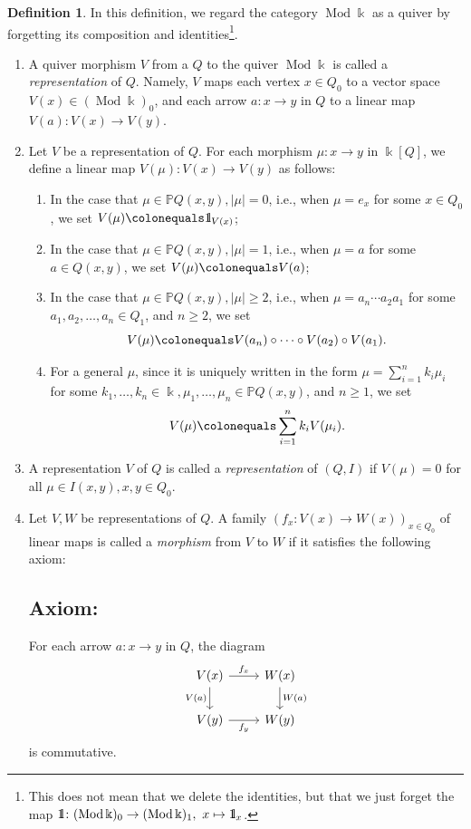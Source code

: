 \documentclass{surv-l}
\numberwithin{equation}{chapter}
\numberwithin{figure}{chapter}
\theoremstyle{plain}
\theoremstyle{definition}
\newtheorem{dfn}[thm]{Definition}
\theoremstyle{remark}
\newcommand{\id}{1\kern-.25em{\text{{\rm l}}}}
\newcommand{\Ar}[3]{\ar[from={#1}, to={#2}, #3]}
\DeclareMathOperator{\Mod}{Mod}
\begin{document}
\begin{dfn}\label{dfn:Rep-bound-quiver}
\let\obls=\baselineskip
{}\obls
In this definition, we regard the category $\Mod\Bbbk$ as a quiver
by forgetting its composition and identities\footnote{This does not mean that
we delete the identities, but that we just forget the map
$\id\colon (\Mod\Bbbk)_0 \to (\Mod\Bbbk)_1,\ x \mapsto \id_x$.}.
\begin{enumerate}
\item
A quiver morphism $V$ from a $Q$ to the quiver $\Mod\Bbbk$ is called
a \emph{representation} of $Q$.
Namely, $V$ maps each vertex $x \in Q_0$ to a vector space
$V(x) \in (\Mod\Bbbk)_0$, and each arrow $a \colon x \to y$ in $Q$
to a linear map $V(a) \colon V(x) \to V(y)$.
\item
Let $V$ be a representation of $Q$.
For each morphism $\mu \colon x \to y$ in $\Bbbk[Q]$,
we define a linear map $V(\mu) \colon V(x) \to V(y)$ as follows:
\begin{enumerate}
\item
In the case that $\mu \in \mathbb{P} Q(x,y), |\mu| = 0$, i.e., when
$\mu = e_x$ for some $x \in Q_0$, we set
$V(\mu)\colonequals  \id_{V(x)}$;
\item
In the case that $\mu \in \mathbb{P} Q(x,y), |\mu| = 1$, i.e., when
$\mu = a$ for some $a \in Q(x, y)$, we set
$V(\mu)\colonequals  V(a)$;
\item
In the case that $\mu \in \mathbb{P} Q(x,y), |\mu| \ge 2$, i.e., when
$\mu = a_n \cdots a_2 a_1$ for some $a_1, a_2, \dots, a_n \in Q_1$, and
$n \ge 2$,
we set
\[
V(\mu)\colonequals  V(a_n)\circ \cdots \circ V(a_2) \circ V(a_1).
\]
\item
For a general $\mu$, since it is uniquely written in the form
$\mu = \sum_{i =1}^n k_i \mu_i$ for some
$k_1, \dots, k_n \in \Bbbk, \mu_1, \dots, \mu_n \in \mathbb{P} Q(x,y)$, and $n \ge 1$,
we set
\[
V(\mu)\colonequals  \sum_{i=1}^n k_i V(\mu_i).
\]
\end{enumerate}
\item
A representation $V$ of $Q$ is called a \emph{representation} of $(Q, I)$
if $V(\mu) = 0$ for all $\mu \in I(x, y), x, y \in Q_0$.
\item
Let $V, W$ be representations of $Q$.
A family $(f_x \colon V(x) \to W(x))_{x \in Q_0}$ of linear maps is called
a \emph{morphism} from $V$ to $W$ if it satisfies the following axiom:

\subsection*{Axiom:} For each arrow $a \colon x \to y$ in $Q$, the diagram
{\small\[
\begin{tikzcd}
V(x) & W(x)\\
V(y) & W(y)
\Ar{1-1}{1-2}{"f_x"}
\Ar{2-1}{2-2}{"f_y" '}
\Ar{1-1}{2-1}{"V(a)" '}
\Ar{1-2}{2-2}{"W(a)"}
\end{tikzcd}
\]}%
is commutative.


\end{enumerate}
\end{dfn}
\end{document}
